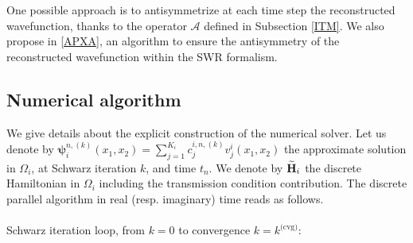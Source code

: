 One possible approach is to antisymmetrize at each time step the reconstructed wavefunction, thanks to the operator $\mathcal{A}$ defined in Subsection \ref{ITM}. We also propose in \ref{APXA}, an algorithm to ensure the antisymmetry of the reconstructed wavefunction within the SWR formalism.
\subsection{Numerical algorithm}\label{expcons}
We give details about the explicit construction of the numerical solver. Let us denote by ${\boldsymbol \psi}_i^{n,(k)}(x_1,x_2) = \sum_{j=1}^{K_i}c_{j}^{i,n,(k)}v_j^i(x_1,x_2)$ the approximate solution in $\Omega_i$, at Schwarz iteration $k$, and time $t_n$. We denote by $\widetilde {\bf H}_i$ the discrete Hamiltonian in $\Omega_i$ including the transmission condition contribution. The discrete parallel algorithm in real (resp. imaginary) time reads as follows.\\
\\
\noindent Schwarz iteration loop, from $k=0$ to convergence $k=k^{\textrm{(cvg)}}$:
